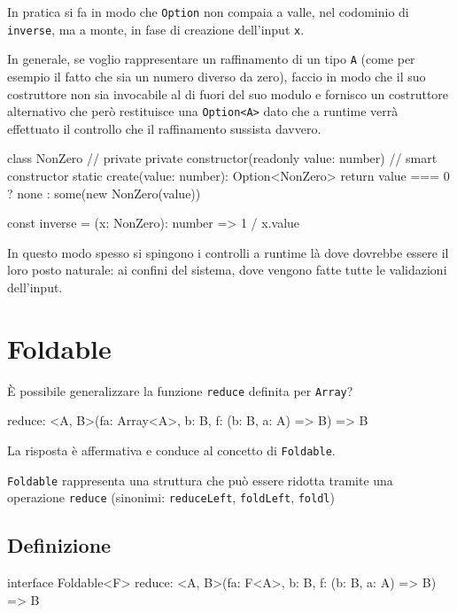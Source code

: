 \documentclass[12pt]{article}
\theoremstyle{definition}
\newenvironment{code}
  {\vspace{0.5cm} \VerbatimEnvironment\begin{typescriptcode}}
  {\end{typescriptcode} \vspace{0.2cm}}
\begin{document}
In pratica si fa in modo che \texttt{Option} non compaia a valle, nel codominio di \texttt{inverse},
ma a monte, in fase di creazione dell'input \texttt{x}.

In generale, se voglio rappresentare un raffinamento di un tipo \texttt{A} (come per esempio il fatto che sia un numero diverso da zero),
faccio in modo che il suo costruttore non sia invocabile al di fuori del suo modulo e fornisco un costruttore alternativo
che però restituisce una \texttt{Option<A>} dato che a runtime verrà effettuato il controllo che il raffinamento sussista davvero.

\begin{code}
class NonZero {
  // private
  private constructor(readonly value: number) {}
  // smart constructor
  static create(value: number): Option<NonZero> {
    return value === 0 ? none : some(new NonZero(value))
  }
}

const inverse = (x: NonZero): number => 1 / x.value
\end{code}

In questo modo spesso si spingono i controlli a runtime là dove dovrebbe essere il loro posto naturale: ai confini del sistema,
dove vengono fatte tutte le validazioni dell'input.

\newpage

\section{Foldable}

È possibile generalizzare la funzione \texttt{reduce} definita per \texttt{Array}?

\begin{code}
reduce: <A, B>(fa: Array<A>, b: B, f: (b: B, a: A) => B) => B
\end{code}

La risposta è affermativa e conduce al concetto di \texttt{Foldable}.

\texttt{Foldable} rappresenta una struttura che può essere ridotta tramite una operazione \texttt{reduce}
(sinonimi: \texttt{reduceLeft}, \texttt{foldLeft}, \texttt{foldl})

\subsection{Definizione}

\begin{code}
interface Foldable<F> {
  reduce: <A, B>(fa: F<A>, b: B, f: (b: B, a: A) => B) => B
}
\end{code}
\end{document}
